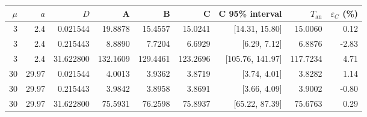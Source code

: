 \begin{tabular}{rrrrrrrrr}
\toprule
$\mu$ & $a$ & $D$ & A & B & C & C 95\% interval & $T_{\mathrm{an}}$ & $\varepsilon_C$ (\%) \\
\midrule
3 & 2.4 & 0.021544 & 19.8878 & 15.4557 & 15.0241 & [14.31, 15.80] & 15.0060 & 0.12 \\
3 & 2.4 & 0.215443 & 8.8890 & 7.7204 & 6.6929 & [6.29, 7.12] & 6.8876 & -2.83 \\
3 & 2.4 & 31.622800 & 132.1609 & 129.4461 & 123.2696 & [105.76, 141.97] & 117.7234 & 4.71 \\
30 & 29.97 & 0.021544 & 4.0013 & 3.9362 & 3.8719 & [3.74, 4.01] & 3.8282 & 1.14 \\
30 & 29.97 & 0.215443 & 3.9842 & 3.8958 & 3.8691 & [3.66, 4.09] & 3.9002 & -0.80 \\
30 & 29.97 & 31.622800 & 75.5931 & 76.2598 & 75.8937 & [65.22, 87.39] & 75.6763 & 0.29 \\
\bottomrule
\end{tabular}

